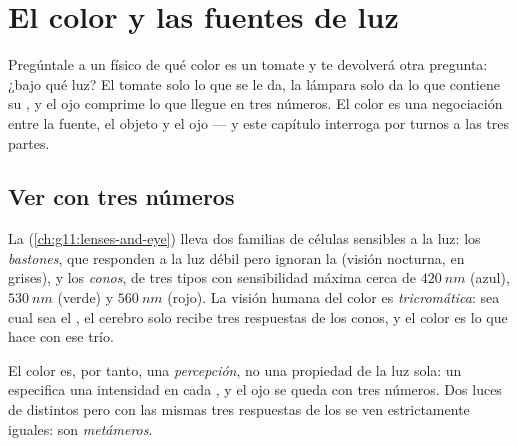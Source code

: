 \chapter{El color y las fuentes de luz}\label{ch:g11:color-light-sources}

Pregúntale a un físico de qué color es un tomate y te devolverá otra
pregunta: ¿bajo qué luz? El tomate solo  lo que se le da, la
lámpara solo da lo que contiene su , y el ojo comprime lo que
llegue en tres números. El color es una negociación entre la fuente, el
objeto y el ojo --- y este capítulo interroga por turnos a las tres
partes.

\section{Ver con tres números}

\begin{definition}\label{def:g11:color-light-sources:cones}
La  (\cref{ch:g11:lenses-and-eye}) lleva dos familias de células
sensibles a la luz: los \emph{bastones}, que responden a
la luz débil pero ignoran la  (visión nocturna, en
grises), y los \emph{conos}, de tres tipos con sensibilidad
máxima cerca de $\qty{420}{nm}$ (azul), $\qty{530}{nm}$ (verde) y
$\qty{560}{nm}$ (rojo). La visión humana del color es
\emph{tricromática}: sea cual sea el
, el cerebro solo recibe tres respuestas de los conos, y el
color es lo que hace con ese trío.
\end{definition}

\begin{definition}\label{def:g11:color-light-sources:perception}
El color es, por tanto, una \emph{percepción}, no una propiedad de la
luz sola: un  especifica una intensidad en cada , y el ojo se queda con tres números. Dos luces de 
distintos pero con las mismas tres respuestas de los  se ven
estrictamente iguales: son \emph{metámeros}.
\end{definition}

